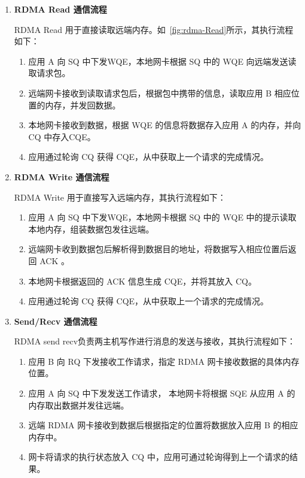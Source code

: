 {    \begin{enumerate}[label=\arabic*.]

        \item \textbf{RDMA Read 通信流程}

              RDMA Read 用于直接读取远端内存。如~\ref{fig:rdma-Read}所示，其执行流程如下：
              \begin{enumerate}
                  \item 应用 A 向 SQ 中下发WQE，本地网卡根据 SQ 中的 WQE 向远端发送读取请求包。
                  \item 远端网卡接收到读取请求包后，根据包中携带的信息，读取应用 B 相应位置的内存，并发回数据。
                  \item 本地网卡接收到数据，根据 WQE 的信息将数据存入应用 A 的内存，并向 CQ 中存入CQE。
                  \item 应用通过轮询 CQ 获得 CQE，从中获取上一个请求的完成情况。
              \end{enumerate}

        \item \textbf{RDMA Write 通信流程}

              RDMA Write 用于直接写入远端内存，其执行流程如下：
              \begin{enumerate}
                  \item 应用 A 向 SQ 中下发WQE，本地网卡根据 SQ 中的 WQE 中的提示读取本地内存，组装数据包发往远端。
                  \item 远端网卡收到数据包后解析得到数据目的地址，将数据写入相应位置后返回 ACK 。
                  \item 本地网卡根据返回的 ACK 信息生成 CQE，并将其放入 CQ。
                  \item 应用通过轮询 CQ 获得 CQE，从中获取上一个请求的完成情况。
              \end{enumerate}

        \item \textbf{Send/Recv 通信流程}

              RDMA send recv负责两主机写作进行消息的发送与接收，其执行流程如下：
              \begin{enumerate}
                  \item 应用 B 向 RQ 下发接收工作请求，指定 RDMA 网卡接收数据的具体内存位置。
                  \item 应用 A 向 SQ 中下发发送工作请求，
                        本地网卡将根据 SQE 从应用 A 的内存取出数据并发往远端。
                  \item 远端 RDMA 网卡接收到数据后根据指定的位置将数据放入应用 B 的相应内存中。
                  \item 网卡将请求的执行状态放入 CQ 中，应用可通过轮询得到上一个请求的结果。
              \end{enumerate}


\end{enumerate}}
